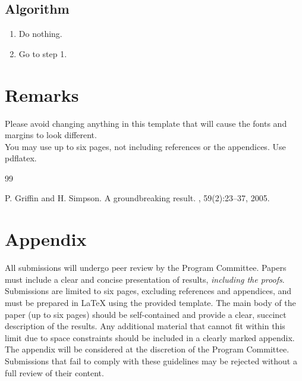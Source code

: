 \documentclass{cccg26}
\begin{document}
\subsection{Algorithm}

\begin{enumerate}
\item
Do nothing.
\item
Go to step 1.
\end{enumerate}




\section{Remarks}   %
Please avoid changing anything in this template that will cause the fonts and margins to look different.\\
You may use up to six pages, not including references or the appendices.
Use pdflatex.\\



\small


\begin{thebibliography}{99}

P. Griffin and H. Simpson.
\newblock A groundbreaking result.
, 59(2):23--37, 2005.

\end{thebibliography}


\newpage
\section*{Appendix}
All submissions will undergo peer review by the Program Committee. Papers must include a clear and concise presentation of results, \emph{including the proofs}. Submissions are limited to six pages, excluding references and appendices, and must be prepared in LaTeX using the provided template.
The main body of the paper (up to six pages) should be self-contained and provide a clear, succinct description of the results. Any additional material that cannot fit within this limit due to space constraints should be included in a clearly marked appendix. The appendix will be considered at the discretion of the Program Committee. Submissions that fail to comply with these guidelines may be rejected without a full review of their content.
\end{document}
